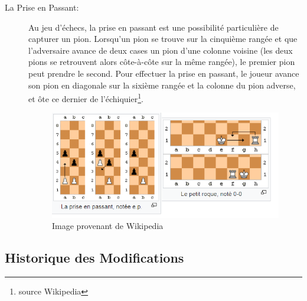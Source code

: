 \documentclass[10pt, a4paper]{article}
\begin{document}
\begin{description}
		\item[La Prise en Passant:] Au jeu d’échecs, la prise en passant est une possibilité particulière de capturer un pion. Lorsqu’un pion se trouve sur la cinquième rangée et que l’adversaire avance de deux cases un pion d’une colonne voisine (les deux pions se retrouvent alors côte-à-côte sur la même rangée), le premier pion peut prendre le second. Pour effectuer la prise en passant, le joueur avance son pion en diagonale sur la sixième rangée et la colonne du pion adverse, et ôte ce dernier de l’échiquier\footnote{source Wikipedia}.
		\begin{figure}[bh]
		\centering
		\includegraphics[scale=1]{roque_prise_passant.png}
		\caption{Image provenant de Wikipedia}
		\end{figure}

		\end{description}
		\clearpage

		\subsection{Historique des Modifications}
\end{document}
